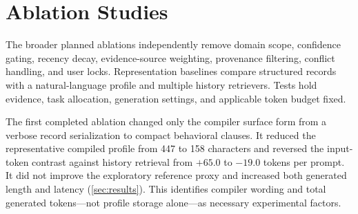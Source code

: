 \section{Ablation Studies}
\label{sec:ablations}

The broader planned ablations independently remove domain scope, confidence gating,
recency decay, evidence-source weighting, provenance filtering, conflict handling,
and user locks. Representation baselines compare structured records with a
natural-language profile and multiple history retrievers. Tests hold evidence,
task allocation, generation settings, and applicable token budget fixed.

The first completed ablation changed only the compiler surface form from a verbose
record serialization to compact behavioral clauses. It reduced the representative
compiled profile from 447 to 158 characters and reversed the input-token contrast
against history retrieval from $+65.0$ to $-19.0$ tokens per prompt. It did not
improve the exploratory reference proxy and increased both generated length and
latency (\cref{sec:results}). This identifies compiler wording and total generated
tokens---not profile storage alone---as necessary experimental factors.

